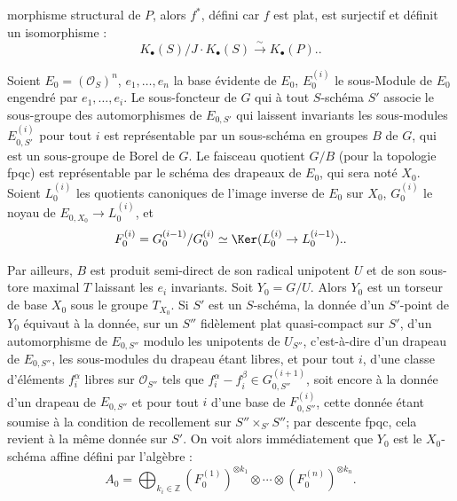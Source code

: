 morphisme structural de $P$, alors $f^*$, défini car $f$ est plat, est surjectif et définit un isomorphisme :
\[
K_\bullet(S)/J\cdot K_\bullet(S)\xrightarrow{\sim}K_\bullet(P)..
\]

Soient $E_0=(\mathcal O_S)^n$, $e_1,\ldots,e_n$ la base évidente de $E_0$, $E_0^{(i)}$ le sous-Module de $E_0$ engendré par $e_1,\ldots,e_i$. Le sous-foncteur de $G$ qui à tout $S$-schéma $S'$ associe le sous-groupe des automorphismes de $E_{0,S'}$ qui laissent invariants les sous-modules $E_{0,S'}^{(i)}$ pour tout $i$ est représentable par un sous-schéma en groupes $B$ de $G$, qui est un sous-groupe de Borel de $G$. Le faisceau quotient $G/B$ (pour la topologie fpqc) est représentable par le schéma des drapeaux de $E_0$, qui sera noté $X_0$. Soient $L_0^{(i)}$ les quotients canoniques de l'image inverse de $E_0$ sur $X_0$, $G_0^{(i)}$ le noyau de $E_{0,X_0}\to L_0^{(i)}$, et
\[
F_0^{(i)}=G_0^{(i-1)}/G_0^{(i)}\simeq \Ker(L_0^{(i)}\to L_0^{(i-1)})..
\]

Par ailleurs, $B$ est produit semi-direct de son radical unipotent $U$ et de son sous-tore maximal $T$ laissant les $e_i$ invariants. Soit $Y_0=G/U$. Alors $Y_0$ est un torseur de base $X_0$ sous le groupe $T_{X_0}$. Si $S'$ est un $S$-schéma, la donnée d'un $S'$-point de $Y_0$ équivaut à la donnée, sur un $S''$ fidèlement plat quasi-compact sur $S'$, d'un automorphisme de $E_{0,S''}$ modulo les unipotents de $U_{S''}$, c'est-à-dire d'un drapeau de $E_{0,S''}$, les sous-modules du drapeau étant libres, et pour tout $i$, d'une classe d'éléments $f_i^\alpha$ libres sur $\mathcal O_{S''}$ tels que $f_i^\alpha-f_i^\beta\in G_{0,S''}^{(i+1)}$, soit encore à la donnée d'un drapeau de $E_{0,S''}$ et pour tout $i$ d'une base de $F_{0,S''}^{(i)}$, cette donnée étant soumise à la condition de recollement sur $S''\times_{S'}S''$; par descente fpqc, cela revient à la même donnée sur $S'$. On voit alors immédiatement que $Y_0$ est le $X_0$-schéma affine défini par l'algèbre :
\[
A_0=\bigoplus_{k_i\in\mathbb Z}(F_0^{(1)})^{\otimes k_1}\otimes\cdots\otimes(F_0^{(n)})^{\otimes k_n}.
\]
